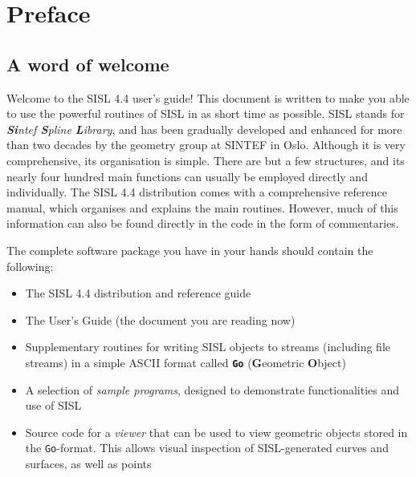 \chapter{Preface}
\section{A word of welcome}
Welcome to the SISL 4.4 user's guide!  This document is written to make you able to use
the powerful routines of SISL in as short time as possible.  SISL stands for
\emph{\textbf{Si}ntef \textbf{S}pline \textbf{L}ibrary}, and has been gradually 
developed and enhanced for more than two decades by the geometry group at SINTEF in Oslo.
Although it is very comprehensive, its organisation is simple.  There are but a 
few structures, and its nearly four hundred main functions can usually be employed
directly and individually.  The SISL 4.4 distribution comes with a comprehensive
reference manual, which organises and explains the main routines.  However, much of this
information can also be found directly in the code in the form of commentaries.

The complete software package you have in your hands should contain the following:
\begin{itemize}
\item The SISL 4.4 distribution and reference guide
\item The User's Guide (the document you are reading now)
\item Supplementary routines for writing SISL objects to streams (including file 
streams) in a simple ASCII format called \textbf{\verb/Go/} (\textbf{G}eometric
\textbf{O}bject)
\item A selection of \emph{sample programs}, designed to demonstrate functionalities
and use of SISL
\item Source code for a \emph{viewer} that can be used to view geometric objects stored
in the \verb/Go/-format.  This allows visual inspection of SISL-generated curves
and surfaces, as well as points
\end{itemize}


